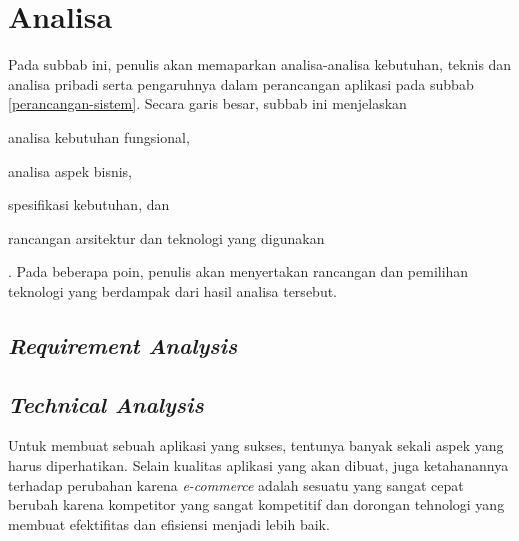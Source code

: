 \section{Analisa}
	Pada subbab ini, penulis akan memaparkan analisa-analisa kebutuhan, teknis dan analisa pribadi serta pengaruhnya dalam perancangan aplikasi pada subbab \ref{perancangan-sistem}. Secara garis besar, subbab ini menjelaskan \begin{inlinelist}
		\item analisa kebutuhan fungsional,
		\item analisa aspek bisnis,
		\item spesifikasi kebutuhan, dan
		\item rancangan arsitektur dan teknologi yang digunakan
	\end{inlinelist}. Pada beberapa poin, penulis akan menyertakan rancangan dan pemilihan teknologi yang berdampak dari hasil analisa tersebut.
	
	\subsection{\textit{Requirement Analysis}}
	
	
	
	 
	
	
	 
	


	\subsection{\textit{Technical Analysis}}
	\label{tech-analysis}
	
	Untuk membuat sebuah aplikasi yang sukses, tentunya banyak sekali aspek yang harus diperhatikan. Selain kualitas aplikasi yang akan dibuat, juga ketahanannya terhadap perubahan karena \textit{e-commerce} adalah sesuatu yang sangat cepat berubah karena kompetitor yang sangat kompetitif dan dorongan tehnologi yang membuat efektifitas dan efisiensi menjadi lebih baik.\\
	
